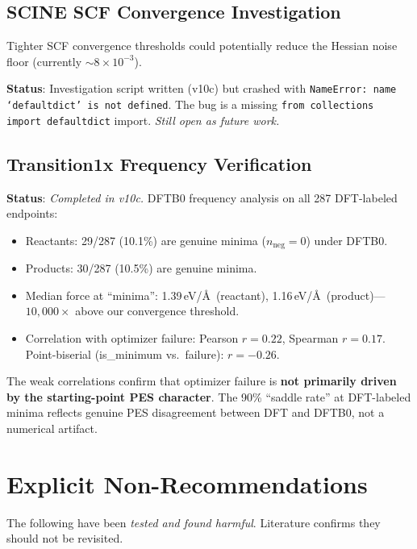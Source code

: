 \documentclass[11pt,a4paper]{article}
\theoremstyle{definition}
\begin{document}
\subsection{SCINE SCF Convergence Investigation}

Tighter SCF convergence thresholds could potentially reduce the Hessian noise
floor (currently $\sim8\times10^{-3}$).

\textbf{Status}: Investigation script written (v10c) but crashed with
\texttt{NameError: name `defaultdict' is not defined}.  The bug is a
missing \texttt{from collections import defaultdict} import.
\emph{Still open as future work.}

\subsection{Transition1x Frequency Verification}

\textbf{Status}: \emph{Completed in v10c.}  DFTB0 frequency analysis on
all 287 DFT-labeled endpoints:
\begin{itemize}[nosep]
  \item Reactants: 29/287 (10.1\%) are genuine minima ($n_\text{neg}=0$)
    under DFTB0.
  \item Products: 30/287 (10.5\%) are genuine minima.
  \item Median force at ``minima'': 1.39\,eV/\AA\ (reactant), 1.16\,eV/\AA\
    (product)---$10{,}000\times$ above our convergence threshold.
  \item Correlation with optimizer failure: Pearson $r=0.22$, Spearman
    $r=0.17$.  Point-biserial (is\_minimum vs.\ failure): $r=-0.26$.
\end{itemize}
The weak correlations confirm that optimizer failure is \textbf{not primarily
driven by the starting-point PES character}.  The 90\% ``saddle rate'' at
DFT-labeled minima reflects genuine PES disagreement between DFT and DFTB0,
not a numerical artifact.

\section{Explicit Non-Recommendations}
\label{sec:non-recommendations}

The following have been \emph{tested and found harmful}.  Literature confirms
they should not be revisited.
\end{document}
